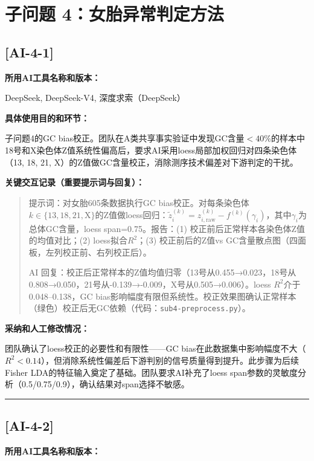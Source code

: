 \documentclass[12pt,a4paper]{ctexart}
\begin{document}
\section*{子问题 4：女胎异常判定方法}

\subsection*{[AI-4-1]}

\textbf{所用AI工具名称和版本：}

DeepSeek, DeepSeek-V4, 深度求索（DeepSeek）

\textbf{具体使用目的和环节：}

子问题4的GC bias校正。团队在A类共享事实验证中发现GC含量$<40\%$的样本中18号和X染色体Z值系统性偏高后，要求AI采用loess局部加权回归对四条染色体（13, 18, 21, X）的Z值做GC含量校正，消除测序技术偏差对下游判定的干扰。

\textbf{关键交互记录（重要提示词与回复）：}

\begin{quote}
提示词：对女胎605条数据执行GC bias校正。对每条染色体$k\in\{13,18,21,\text{X}\}$的Z值做loess回归：$\tilde{z}_i^{(k)} = z_{i,\text{raw}}^{(k)} - f^{(k)}(\gamma_i)$，其中$\gamma_i$为总体GC含量，loess span=0.75。报告：(1) 校正前后正常样本各染色体Z值的均值对比；(2) loess拟合$R^2$；(3) 校正前后的Z值vs GC含量散点图（四面板，左列校正前、右列校正后）。

AI 回复：校正后正常样本的Z值均值归零（13号从0.455→0.023，18号从0.808→0.050，21号从-0.139→-0.009，X号从0.505→0.006）。loess $R^2$介于0.048--0.138，GC bias影响幅度有限但系统性。校正效果图确认正常样本（绿色）校正后无GC依赖（代码：\texttt{sub4-preprocess.py}）。
\end{quote}

\textbf{采纳和人工修改情况：}

团队确认了loess校正的必要性和有限性——GC bias在此数据集中影响幅度不大（$R^2<0.14$），但消除系统性偏差后下游判别的信号质量得到提升。此步骤为后续Fisher LDA的特征输入奠定了基础。团队要求AI补充了loess span参数的灵敏度分析（0.5/0.75/0.9），确认结果对span选择不敏感。

\vspace{1em}
\hrule
\vspace{1em}

\subsection*{[AI-4-2]}

\textbf{所用AI工具名称和版本：}
\end{document}
